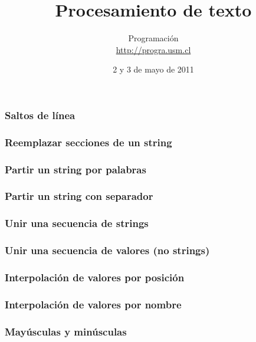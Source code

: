 \documentclass[12pt]{beamer}
\title{Procesamiento de texto}
\author{
  Programación \\ \url{http://progra.usm.cl}
}
\date{2 y 3 de mayo de 2011}
\begin{document}
  \begin{frame}
    \maketitle
  \end{frame}

  \begin{frame}
    \label{saltos-linea}
    \frametitle{Saltos de línea}
    
  \end{frame}

  \begin{frame}
    \label{reemplazar}
    \frametitle{Reemplazar secciones de un string}
    
  \end{frame}

  \begin{frame}
    \label{partir-string-palabras}
    \frametitle{Partir un string por palabras}
    
  \end{frame}

  \begin{frame}
    \label{partir-string-separador}
    \frametitle{Partir un string con separador}
    
  \end{frame}

  \begin{frame}
    \label{unir-strings}
    \frametitle{Unir una secuencia de strings}
    
  \end{frame}

  \begin{frame}
    \label{unir-valores}
    \frametitle{Unir una secuencia de valores (no strings)}
    
  \end{frame}

  \begin{frame}
    \label{interpolacion-posicion}
    \frametitle{Interpolación de valores por posición}
    
  \end{frame}

  \begin{frame}
    \label{interpolacion-nombre}
    \frametitle{Interpolación de valores por nombre}
    
  \end{frame}

  \begin{frame}
    \label{mayusculas-minusculas}
    \frametitle{Mayúsculas y minúsculas}
    
  \end{frame}
\end{document}
